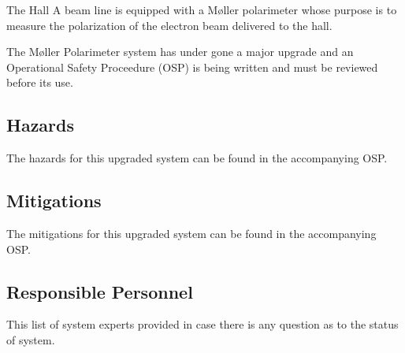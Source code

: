 
The Hall A beam line is equipped with a M{\o}ller 
polarimeter
whose purpose is 
to measure the polarization of the electron beam delivered to the hall. 

%
%
\begin{safetyen}{0}{0}

The M{\o}ller Polarimeter system has under gone a major upgrade and an Operational Safety Proceedure (OSP)
is being written and must be reviewed before its use.

\subsection{Hazards}

The hazards for this upgraded system can be found in the accompanying OSP.

\subsection{Mitigations}

The mitigations for this upgraded system can be found in the accompanying OSP.

\subsection{Responsible Personnel}
\label{sec:moller-pers}

This list of system experts provided in case there is any question as to the status of system.


\end{safetyen}
